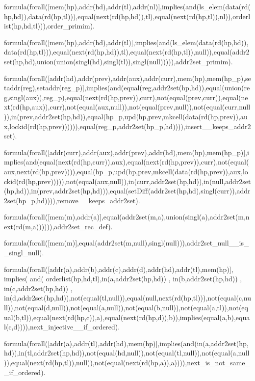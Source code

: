 formula(forall([mem(hp),addr(hd),addr(tl),addr(nl)],implies(and(ls\_elem(data(rd(hp,hd)),data(rd(hp,tl))),equal(next(rd(hp,hd)),tl),equal(next(rd(hp,tl)),nl)),orderlist(hp,hd,tl))),order\_primim).

formula(forall([mem(hp),addr(hd),addr(tl)],implies(and(ls\_elem(data(rd(hp,hd)),data(rd(hp,tl))),equal(next(rd(hp,hd)),tl),equal(next(rd(hp,tl)),null)),equal(addr2set(hp,hd),union(union(singl(hd),singl(tl)),singl(null))))),addr2set\_primim).

formula(forall([addr(hd),addr(prev),addr(aux),addr(curr),mem(hp),mem(hp\_p),setaddr(reg),setaddr(reg\_p)],implies(and(equal(reg,addr2set(hp,hd)),equal(union(reg,singl(aux)),reg\_p),equal(next(rd(hp,prev)),curr),not(equal(prev,curr)),equal(next(rd(hp,aux)),curr),not(equal(aux,null)),not(equal(prev,null)),not(equal(curr,null)),in(prev,addr2set(hp,hd)),equal(hp\_p,upd(hp,prev,mkcell(data(rd(hp,prev)),aux,lockid(rd(hp,prev)))))),equal(reg\_p,addr2set(hp\_p,hd)))),insert\_\_keeps\_addr2set).

formula(forall([addr(curr),addr(aux),addr(prev),addr(hd),mem(hp),mem(hp\_p)],implies(and(equal(next(rd(hp,curr)),aux),equal(next(rd(hp,prev)),curr),not(equal(aux,next(rd(hp,prev)))),equal(hp\_p,upd(hp,prev,mkcell(data(rd(hp,prev)),aux,lockid(rd(hp,prev))))),not(equal(aux,null)),in(curr,addr2set(hp,hd)),in(null,addr2set(hp,hd)),in(prev,addr2set(hp,hd))),equal(setDiff(addr2set(hp,hd),singl(curr)),addr2set(hp\_p,hd)))),remove\_\_keeps\_addr2set).


formula(forall([mem(m),addr(a)],equal(addr2set(m,a),union(singl(a),addr2set(m,next(rd(m,a)))))),addr2set\_rec\_def).

formula(forall([mem(m)],equal(addr2set(m,null),singl(null))),addr2set\_null\_\_is\_\_singl\_null).




formula(forall([addr(a),addr(b),addr(c),addr(d),addr(hd),addr(tl),mem(hp)], implies( and( orderlist(hp,hd,tl),in(a,addr2set(hp,hd)) , in(b,addr2set(hp,hd)) , in(c,addr2set(hp,hd)) , in(d,addr2set(hp,hd)),not(equal(tl,null)),equal(null,next(rd(hp,tl))),not(equal(c,null)),not(equal(d,null)),not(equal(a,null)),not(equal(b,null)),not(equal(a,tl)),not(equal(b,tl)),equal(next(rd(hp,c)),a),equal(next(rd(hp,d)),b)),implies(equal(a,b),equal(c,d)))),next\_injective\_\_if\_ordered).

formula(forall([addr(a),addr(tl),addr(hd),mem(hp)],implies(and(in(a,addr2set(hp,hd)),in(tl,addr2set(hp,hd)),not(equal(hd,null)),not(equal(tl,null)),not(equal(a,null)),equal(next(rd(hp,tl)),null)),not(equal(next(rd(hp,a)),a)))),next\_is\_not\_same\_\_if\_ordered).

